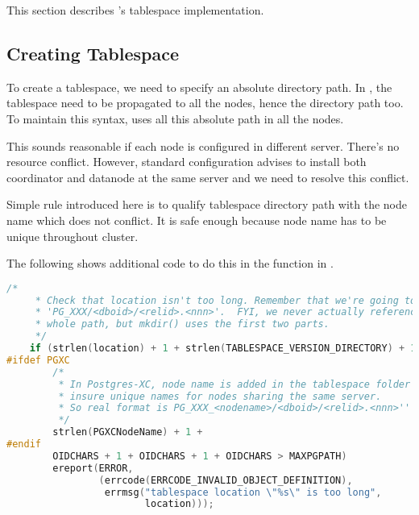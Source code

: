 %
%

This section describes \XC's tablespace implementation.


\subsection{Creating Tablespace}

  To create a tablespace, we need to specify an absolute directory path.
  In \XC, the tablespace need to be propagated to all the nodes, hence the directory path too.
  To maintain this syntax, \XC{} uses all this absolute path in all the nodes.
  
  This sounds reasonable if each node is configured in different server.
  There's no resource conflict.
  However, standard \XC{} configuration advises to install both coordinator and datanode
  at the same server and we need to resolve this conflict.
  
  Simple rule introduced here is to qualify tablespace directory path with the node name
  which does not conflict.
  It is safe enough because node name has to be unique throughout \XC{} cluster.
  
  The following shows additional code to do this in the function  in
  .

\lstset{tabsize=8, xleftmargin=20pt, basicstyle=\ttfamily\scriptsize, breaklines=true}
\begin{lstlisting}[frame=single, tabsize=4, language=C]
    /*
     * Check that location isn't too long. Remember that we're going to append
     * 'PG_XXX/<dboid>/<relid>.<nnn>'.  FYI, we never actually reference the
     * whole path, but mkdir() uses the first two parts.
     */
    if (strlen(location) + 1 + strlen(TABLESPACE_VERSION_DIRECTORY) + 1 +
#ifdef PGXC
        /*
         * In Postgres-XC, node name is added in the tablespace folder name to
         * insure unique names for nodes sharing the same server.
         * So real format is PG_XXX_<nodename>/<dboid>/<relid>.<nnn>''
         */
        strlen(PGXCNodeName) + 1 +
#endif
        OIDCHARS + 1 + OIDCHARS + 1 + OIDCHARS > MAXPGPATH)
        ereport(ERROR,
                (errcode(ERRCODE_INVALID_OBJECT_DEFINITION),
                 errmsg("tablespace location \"%s\" is too long",
                        location)));

\end{lstlisting}

